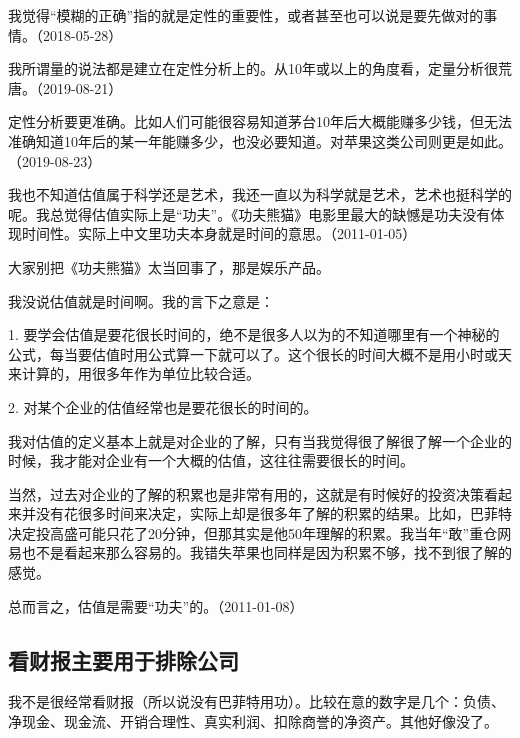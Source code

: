 我觉得“模糊的正确”指的就是定性的重要性，或者甚至也可以说是要先做对的事情。（2018-05-28）

我所谓量的说法都是建立在定性分析上的。从10年或以上的角度看，定量分析很荒唐。（2019-08-21）

定性分析要更准确。比如人们可能很容易知道茅台10年后大概能赚多少钱，但无法准确知道10年后的某一年能赚多少，也没必要知道。对苹果这类公司则更是如此。（2019-08-23）


我也不知道估值属于科学还是艺术，我还一直以为科学就是艺术，艺术也挺科学的呢。我总觉得估值实际上是“功夫”。《功夫熊猫》电影里最大的缺憾是功夫没有体现时间性。实际上中文里功夫本身就是时间的意思。（2011-01-05）


大家别把《功夫熊猫》太当回事了，那是娱乐产品。

我没说估值就是时间啊。我的言下之意是：

1. 要学会估值是要花很长时间的，绝不是很多人以为的不知道哪里有一个神秘的公式，每当要估值时用公式算一下就可以了。这个很长的时间大概不是用小时或天来计算的，用很多年作为单位比较合适。

2. 对某个企业的估值经常也是要花很长的时间的。

我对估值的定义基本上就是对企业的了解，只有当我觉得很了解很了解一个企业的时候，我才能对企业有一个大概的估值，这往往需要很长的时间。

当然，过去对企业的了解的积累也是非常有用的，这就是有时候好的投资决策看起来并没有花很多时间来决定，实际上却是很多年了解的积累的结果。比如，巴菲特决定投高盛可能只花了20分钟，但那其实是他50年理解的积累。我当年“敢”重仓网易也不是看起来那么容易的。我错失苹果也同样是因为积累不够，找不到很了解的感觉。

总而言之，估值是需要“功夫”的。（2011-01-08）

\subsection{看财报主要用于排除公司}


我不是很经常看财报（所以说没有巴菲特用功）。比较在意的数字是几个：负债、净现金、现金流、开销合理性、真实利润、扣除商誉的净资产。其他好像没了。

